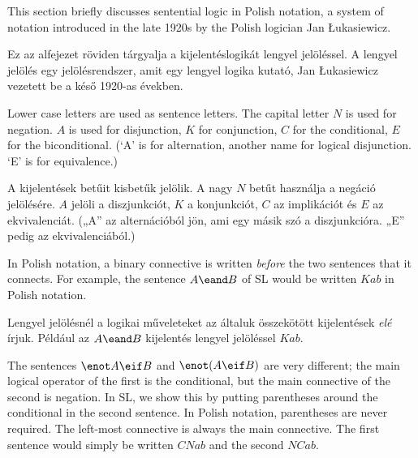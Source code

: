 This section briefly discusses sentential logic in Polish notation, a system of notation introduced in the late 1920s by the Polish logician Jan {\L}ukasiewicz.

Ez az alfejezet röviden tárgyalja a kijelentéslogikát lengyel jelöléssel. A lengyel jelölés egy jelölésrendszer, amit egy lengyel logika kutató, Jan {\L}ukasiewicz vezetett be a késő 1920-as években.


Lower case letters are used as sentence letters. The capital letter $N$ is used for negation. $A$ is used for disjunction, $K$ for conjunction, $C$ for the conditional, $E$ for the biconditional. (`A' is for alternation, another name for logical disjunction. `E' is for equivalence.)

A kijelentések betűit kisbetűk jelölik. A nagy $N$ betűt használja a negáció jelölésére. $A$ jelöli a diszjunkciót, $K$ a konjunkciót, $C$ az implikációt és $E$ az ekvivalenciát. („A” az  alternációból jön, ami egy másik szó a diszjunkcióra. „E” pedig az ekvivalenciából.)


In Polish notation, a binary connective is written \emph{before} the two sentences that it connects. For example, the sentence $A\eand B$ of SL would be written $Kab$ in Polish notation.

Lengyel jelölésnél a logikai műveleteket az általuk összekötött kijelentések \emph{elé} írjuk. Például az $A\eand B$ kijelentés lengyel jelöléssel $Kab$.


The sentences $\enot A\eif B$ and $\enot (A\eif B)$ are very different; the main logical operator of the first is the conditional, but the main connective of the second is negation. In SL, we show this by putting parentheses around the conditional in the second sentence. In Polish notation, parentheses are never required. The left-most connective is always the main connective. The first sentence would simply be written $CNab$ and the second $NCab$.

